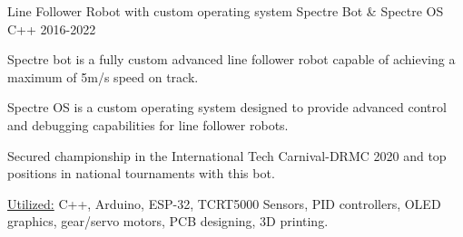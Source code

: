 \begin{cventries}
      \cventryprojects
      {Line Follower Robot with custom operating system} %
      {Spectre Bot \& Spectre OS} %
      {C++} %
      {2016-2022} %
      {
        \begin{cvitems} %
          \item {Spectre bot is a fully custom advanced line 
          follower robot capable of achieving a maximum of 5m/s speed on track.}
          \item {Spectre OS is a custom operating system designed to provide advanced control and 
          debugging capabilities for line follower robots.}
          \item {Secured championship in the International Tech Carnival-DRMC 2020 and top positions in national tournaments with this bot.}
          \item {\underline{Utilized:} C++, Arduino, ESP-32, TCRT5000 Sensors, PID controllers, OLED graphics, gear/servo motors, PCB designing, 3D printing.}
        \end{cvitems}
        }   
        

\end{cventries}
